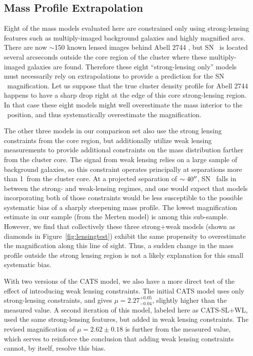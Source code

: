 \subsection{Mass Profile Extrapolation}
\label{sec:MassProfileExtrapolation}

Eight of the mass models evaluated here are constrained only using
strong-lensing features such as multiply-imaged background galaxies
and highly magnified arcs.  There are now $\sim$150 known lensed
images behind Abell 2744 \citep{Jauzac:2014c}, but SN \tomas\ is
located several arcseconds outside the core region of the cluster
where these multiply-imaged galaxies are found.  Therefore these eight
``strong-lensing only'' models must necessarily rely on extrapolations
to provide a prediction for the SN \tomas\ magnification.  Let us
suppose that the true cluster density profile for Abell 2744 happens
to have a sharp drop right at the edge of this core strong-lensing
region. In that case these eight models might well overestimate the
mass interior to the \tomas\ position, and thus systematically
overestimate the magnification.

The other three models in our comparison set also use the strong
lensing constraints from the core region, but additionally utilize
weak lensing measurements to provide additional constraints on the
mass distribution farther from the cluster core.  The signal from weak
lensing relies on a large sample of background galaxies, so this
constraint operates principally at separations more than 1\arcmin\
from the cluster core.  At a projected separation of $\sim40^{\prime\prime}$,
SN \tomas\ falls in between the strong- and weak-lensing regimes, and
one would expect that models incorporating both of those constraints
would be less susceptible to the possible systematic bias of
a sharply steepening mass profile.  The lowest magnification estimate
in our sample (from the Merten model) is among this sub-sample.
However, we find that collectively these three strong+weak models
(shown as diamonds in Figure~\ref{fig:lensingtest}) exhibit the same
propensity to overestimate the magnification along this line of sight.
Thus, a sudden change in the mass profile outside the strong lensing
region is not a likely explanation for this small systematic bias.

With two versions of the CATS model, we also have a more direct test
of the effect of introducing weak lensing constraints.  The initial
CATS model uses only strong-lensing constraints, and gives
$\mu=2.27^{+0.05}_{-0.04}$, slightly higher than the measured value.
A second iteration of this model, labeled here as CATS-SL+WL, used the
same strong-lensing features, but added in weak lensing constraints.
The revised magnification of $\mu=2.62\pm0.18$ is further from the
measured value, which serves to reinforce the conclusion that adding
weak lensing constraints cannot, by itself, resolve this bias.


